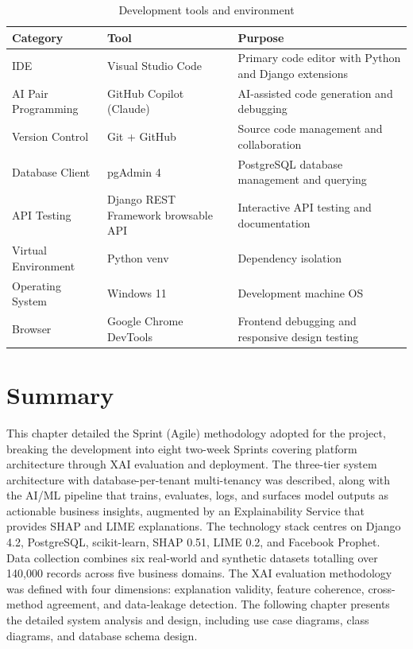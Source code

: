 \documentclass[12pt,a4paper]{report}
\begin{document}
\begin{table}[H]
\centering
\caption{Development tools and environment}
\label{tab:dev_tools}
\begin{tabularx}{\textwidth}{l l >{\raggedright\arraybackslash}X}
\toprule
\textbf{Category} & \textbf{Tool} & \textbf{Purpose} \\
\midrule
IDE & Visual Studio Code & Primary code editor with Python and Django extensions \\
AI Pair Programming & GitHub Copilot (Claude) & AI-assisted code generation and debugging \\
Version Control & Git + GitHub & Source code management and collaboration \\
Database Client & pgAdmin 4 & PostgreSQL database management and querying \\
API Testing & Django REST Framework browsable API & Interactive API testing and documentation \\
Virtual Environment & Python venv & Dependency isolation \\
Operating System & Windows 11 & Development machine OS \\
Browser & Google Chrome DevTools & Frontend debugging and responsive design testing \\
\bottomrule
\end{tabularx}
\end{table}


\section{Summary}
\label{sec:meth_summary}

This chapter detailed the Sprint (Agile) methodology adopted for the project, breaking the development into eight two-week Sprints covering platform architecture through XAI evaluation and deployment. The three-tier system architecture with database-per-tenant multi-tenancy was described, along with the AI/ML pipeline that trains, evaluates, logs, and surfaces model outputs as actionable business insights, augmented by an Explainability Service that provides SHAP and LIME explanations. The technology stack centres on Django 4.2, PostgreSQL, scikit-learn, SHAP 0.51, LIME 0.2, and Facebook Prophet. Data collection combines six real-world and synthetic datasets totalling over 140,000 records across five business domains. The XAI evaluation methodology was defined with four dimensions: explanation validity, feature coherence, cross-method agreement, and data-leakage detection. The following chapter presents the detailed system analysis and design, including use case diagrams, class diagrams, and database schema design.
\end{document}
